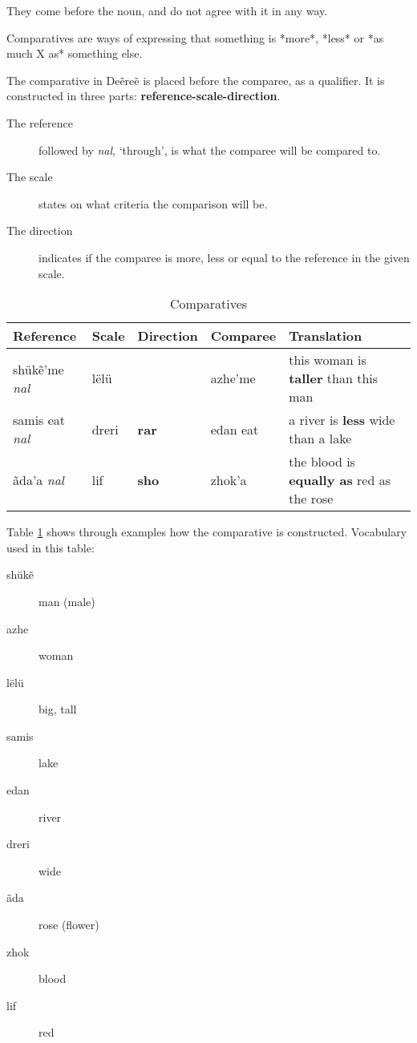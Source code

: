 
They come before the noun, and do not agree with it in any way.

Comparatives are ways of expressing that something is *more*, *less* or *as much X as* something else.

The comparative in Deẽreẽ is placed before the comparee, as a qualifier.
It is constructed in three parts: \textbf{reference-scale-direction}.

\begin{description}
\item[The reference] followed by \emph{nal}, ‘through’, is what the comparee will be compared to.
\item[The scale] states on what criteria the comparison will be.
\item[The direction] indicates if the comparee is more, less or equal to the reference in the given scale.
\end{description}

\begin{table}[h]
\begin{center}
\begin{tabular}{|llll|l|}\hline

\textbf{Reference} & \textbf{Scale} & \textbf{Direction} & \textbf{Comparee} & \textbf{Translation} \\\hline

shükẽ’me \emph{nal} & lëlü & & azhe’me & this woman is \textbf{taller} than this man \\\hline
samis eat \emph{nal} & dreri & \textbf{rar} & edan eat & a river is \textbf{less} wide than a lake \\\hline
ãda’a \emph{nal} & lif & \textbf{sho} & zhok’a & the blood is \textbf{equally as} red as the rose \\\hline

\end{tabular}
\end{center}
\caption{Comparatives}
\label{tab:morphology-comparatives}
\end{table}

Table \ref{tab:morphology-comparatives} shows through examples how the comparative is constructed. Vocabulary used in this table:

\begin{description}
\item[shükẽ] man (male)
\item[azhe] woman
\item[lëlü] big, tall
\item[samis] lake
\item[edan] river
\item[dreri] wide
\item[ãda] rose (flower)
\item[zhok] blood
\item[lif] red
\end{description}

